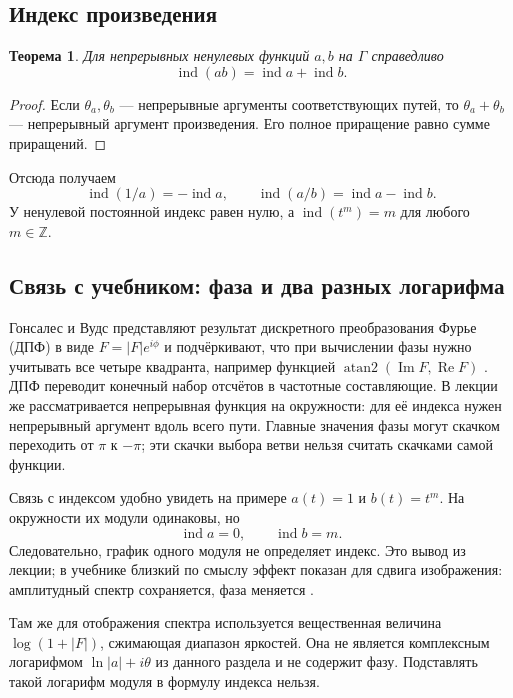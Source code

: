 \documentclass[12pt,a4paper]{article}
\newtheorem{theorem}{Теорема}
\theoremstyle{definition}
\theoremstyle{remark}
\newcommand{\ZZ}{\mathbb{Z}}
\DeclareMathOperator{\ind}{ind}
\begin{document}
\subsection{Индекс произведения}

\begin{theorem}
Для непрерывных ненулевых функций $a,b$ на $\Gamma$ справедливо
\[
  \boxed{\ind(ab)=\ind a+\ind b}.
\]
\end{theorem}

\begin{proof}
Если $\theta_a,\theta_b$ --- непрерывные аргументы соответствующих
путей, то $\theta_a+\theta_b$ --- непрерывный аргумент произведения.
Его полное приращение равно сумме приращений.
\end{proof}

Отсюда получаем
\[
  \ind(1/a)=-\ind a,\qquad
  \ind(a/b)=\ind a-\ind b.
\]
У ненулевой постоянной индекс равен нулю, а $\ind(t^m)=m$ для
любого $m\in\ZZ$.

\subsection{Связь с учебником: фаза и два разных логарифма}

Гонсалес и Вудс представляют результат дискретного преобразования
Фурье (ДПФ) в виде $F=|F|e^{i\phi}$ и подчёркивают, что при вычислении
фазы нужно учитывать все четыре квадранта, например функцией
$\operatorname{atan2}(\operatorname{Im}F,\operatorname{Re}F)$
\cite[\S\,4.6.5, с.~293]{GW2012}.
ДПФ переводит конечный набор отсчётов в частотные составляющие.
В лекции же рассматривается непрерывная функция на окружности:
для её индекса нужен непрерывный аргумент вдоль всего пути.
Главные значения фазы могут скачком переходить от $\pi$ к $-\pi$;
эти скачки выбора ветви нельзя считать скачками самой функции.

Связь с индексом удобно увидеть на примере $a(t)=1$ и $b(t)=t^m$.
На окружности их модули одинаковы, но
\[
  \ind a=0,\qquad \ind b=m.
\]
Следовательно, график одного модуля не определяет индекс.
Это вывод из лекции; в учебнике близкий по смыслу эффект показан
для сдвига изображения: амплитудный спектр сохраняется, фаза меняется
\cite[\S\,4.6.5, с.~294]{GW2012}.

Там же для отображения спектра используется вещественная величина
$\log(1+|F|)$, сжимающая диапазон яркостей.
Она не является комплексным логарифмом
$\ln|a|+i\theta$ из данного раздела и не содержит фазу.
Подставлять такой логарифм модуля в формулу индекса нельзя.
\end{document}
